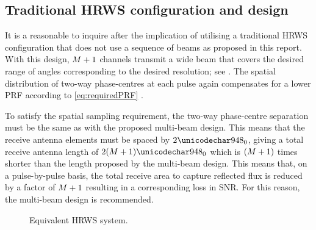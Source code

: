 \subsection{Traditional HRWS configuration and design}
It is a reasonable to inquire after the implication of utilising a traditional HRWS configuration that does not use a sequence of beams as proposed in this report. With this design, $M + 1$ channels transmit a wide beam that covers the desired range of angles corresponding to the desired resolution; see . The spatial distribution of two-way phase-centres at each pulse again compensates for a lower PRF according to \eqref{eq:requiredPRF} \cite{GebertPHD}.
\par
To satisfy the spatial sampling requirement, the two-way phase-centre separation must be the same as with the proposed multi-beam design. This means that the receive antenna elements must be spaced by $2\resxDesired$, giving a total receive antenna length of $2(\channelM + 1)\resxDesired$ which is $(M + 1)$ times shorter than the length proposed by the multi-beam design. This means that, on a pulse-by-pulse basis, the total receive area to capture reflected flux is reduced by a factor of $M + 1$ resulting in a corresponding loss in SNR. For this reason, the multi-beam design is recommended.
\begin{figure}[h!]
\begin{center}
 \resizebox{0.7\columnwidth}{!}{}
 \caption{Equivalent HRWS system.}
 \label{fg:equivHRWS}
 \end{center}
\end{figure}

